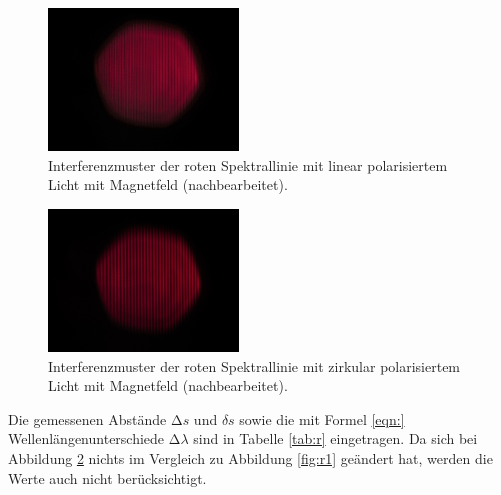 \FloatBarrier
\begin{figure}
  \centering
  \includegraphics[width=0.45\textwidth]{IMG_0104k.jpg}
  \caption{Interferenzmuster der roten Spektrallinie mit linear polarisiertem Licht mit Magnetfeld (nachbearbeitet).}
  \label{fig:r2}
\end{figure}
\FloatBarrier
\FloatBarrier
\begin{figure}
  \centering
  \includegraphics[width=0.45\textwidth]{IMG_0105k.jpg}
  \caption{Interferenzmuster der roten Spektrallinie mit zirkular polarisiertem Licht mit Magnetfeld (nachbearbeitet).}
  \label{fig:r3}
\end{figure}
\FloatBarrier

Die gemessenen Abstände $\increment s$ und  $\delta s$ sowie die mit Formel
\ref{eqn:} %
Wellenlängenunterschiede $\increment \lambda$ sind in Tabelle \ref{tab:r} eingetragen. Da sich bei Abbildung \ref{fig:r3}
nichts im Vergleich zu Abbildung \ref{fig:r1} geändert hat, werden die Werte auch nicht berücksichtigt. 

